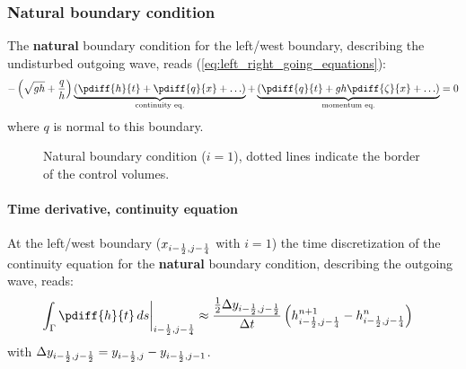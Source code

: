 \subsubsection{Natural boundary condition}
The \textbf{natural} boundary condition for the left/west boundary, describing the undisturbed outgoing wave, reads (\autoref{eq:left_right_going_equations}):
\begin{align}
    - \left(\sqrt{gh} + \frac{q}{h}\right) \underbrace{ \left(\pdiff{h}{t} + \pdiff{q}{x} + \ldots \right) }_{\text{continuity eq.}} + \underbrace{\left(\pdiff{q}{t} + g h \pdiff{\zeta}{x}+\ldots\right)}_{\text{momentum eq.}} = 0
\end{align}
where $q$ is normal to this boundary.
\begin{figure}[H]
    \begin{center}
        \def\svgwidth{0.80\textwidth} %
        \resizebox{0.65\textwidth}{!}{
            
        }
    \end{center}
    \caption{Natural boundary condition ($i=1$), dotted lines indicate the border of the control volumes.}
    \label{fig:structured_grid_along_straight_boundary_natural}
\end{figure}
\paragraph*{Time derivative, continuity equation}
At the left/west boundary ($x_{i-\frac{1}{2}, j-\frac{1}{4}}$ with $i=1$) the time discretization of the continuity equation for the \textbf{natural} boundary condition, describing the outgoing wave, reads:
\begin{align}
    \left.\int_\Gamma\pdiff{h}{t}\, ds \right|_{i-\half, j-\quart} & \approx  \frac{\half\Dy_{i-\half, j-\half}}{\Dt}   \left(  h^{n+1}_{i-\half, j-\quart} - h^{n}_{i-\half, j-\quart} \right)
\end{align}
with $\Delta y_{i-\frac{1}{2}, j-\frac{1}{2}} = y_{i-\frac{1}{2}, j} - y_{i-\frac{1}{2}, j-1}$.

